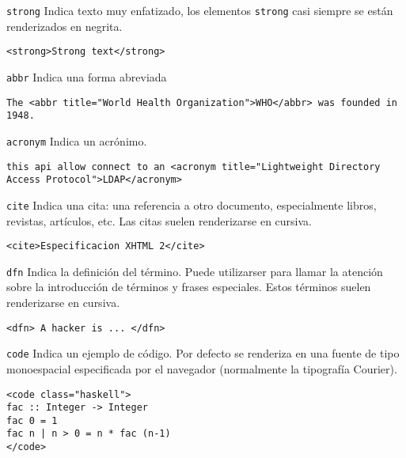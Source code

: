 \begin{frame}[fragile]{\texttt{strong}} %
    Indica texto muy enfatizado, los elementos \texttt{strong} casi siempre se
    están renderizados en negrita.
    \begin{lstlisting}
<strong>Strong text</strong>
    \end{lstlisting}
\end{frame}

\begin{frame}[fragile]{\texttt{abbr}} %
    Indica una forma abreviada
    \begin{lstlisting}
The <abbr title="World Health Organization">WHO</abbr> was founded in 1948.
    \end{lstlisting}
\end{frame}

\begin{frame}[fragile]{\texttt{acronym}} %
    Indica un acrónimo.
\begin{lstlisting} 
this api allow connect to an <acronym title="Lightweight Directory Access Protocol">LDAP</acronym>
\end{lstlisting}
\end{frame}

\begin{frame}[fragile]{\texttt{cite}} %
    Indica una cita: una referencia a otro documento, especialmente libros,
    revistas, artículos, etc. Las citas suelen renderizarse en cursiva. 
\begin{lstlisting}
<cite>Especificacion XHTML 2</cite>
\end{lstlisting}
\end{frame}

\begin{frame}[fragile]{\texttt{dfn}} %
    Indica la definición del término. Puede utilizarser para llamar la
    atención sobre la introducción de términos y frases especiales. Estos
    términos suelen renderizarse en cursiva. 
    \begin{lstlisting}
<dfn> A hacker is ... </dfn>
    \end{lstlisting}
\end{frame}

\begin{frame}[fragile]{\texttt{code}} %
    Indica un ejemplo de código. Por defecto se renderiza en una fuente de tipo
    monoespacial especificada por el navegador (normalmente la tipografía
    Courier). 

\begin{lstlisting}
<code class="haskell">
fac :: Integer -> Integer
fac 0 = 1
fac n | n > 0 = n * fac (n-1)
</code>
\end{lstlisting}
\end{frame}

